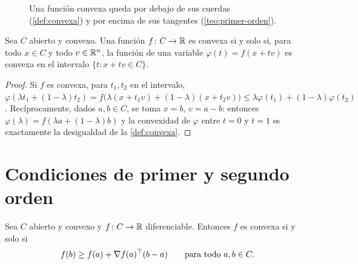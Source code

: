 \begin{figure}[h]
\centering
{}
\caption{Una función convexa queda por debajo de sus cuerdas (\cref{def:convexa}) y por encima de sus tangentes (\cref{teo:primer-orden}).}
\label{fig:convexa}
\end{figure}

\begin{lema}\label{lem:rectas}
Sea $C$ abierto y convexo. Una función $f\colon C\to\mathbb{R}$ es convexa si y solo si, para todo $x\in C$ y todo $v\in\mathbb{R}^{n}$, la función de una variable $\varphi(t)=f(x+tv)$ es convexa en el intervalo $\{t:x+tv\in C\}$.
\end{lema}

\begin{proof}
Si $f$ es convexa, para $t_1,t_2$ en el intervalo, $\varphi(\lambda t_1+(1-\lambda)t_2)=f\bigl(\lambda(x+t_1v)+(1-\lambda)(x+t_2v)\bigr)\le\lambda\varphi(t_1)+(1-\lambda)\varphi(t_2)$. Recíprocamente, dados $a,b\in C$, se toma $x=b$, $v=a-b$: entonces $\varphi(\lambda)=f(\lambda a+(1-\lambda)b)$ y la convexidad de $\varphi$ entre $t=0$ y $t=1$ es exactamente la desigualdad de la \cref{def:convexa}.
\end{proof}

\section{Condiciones de primer y segundo orden}

\begin{teorema}\label{teo:primer-orden}
Sea $C$ abierto y convexo y $f\colon C\to\mathbb{R}$ diferenciable. Entonces $f$ es convexa si y solo si
\[
f(b)\ge f(a)+\nabla f(a)^{\top}(b-a)\qquad\text{para todo } a,b\in C.
\]
\end{teorema}

